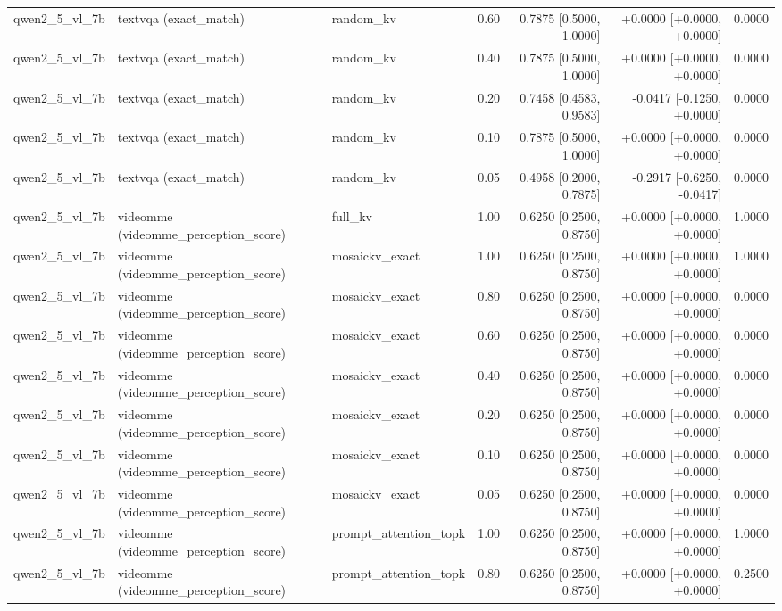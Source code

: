 \begin{longtable}{lllrrrr}
qwen2\_5\_vl\_7b & textvqa (exact\_match) & random\_kv & 0.60 & 0.7875 [0.5000, 1.0000] & +0.0000 [+0.0000, +0.0000] & 0.0000 \\
qwen2\_5\_vl\_7b & textvqa (exact\_match) & random\_kv & 0.40 & 0.7875 [0.5000, 1.0000] & +0.0000 [+0.0000, +0.0000] & 0.0000 \\
qwen2\_5\_vl\_7b & textvqa (exact\_match) & random\_kv & 0.20 & 0.7458 [0.4583, 0.9583] & -0.0417 [-0.1250, +0.0000] & 0.0000 \\
qwen2\_5\_vl\_7b & textvqa (exact\_match) & random\_kv & 0.10 & 0.7875 [0.5000, 1.0000] & +0.0000 [+0.0000, +0.0000] & 0.0000 \\
qwen2\_5\_vl\_7b & textvqa (exact\_match) & random\_kv & 0.05 & 0.4958 [0.2000, 0.7875] & -0.2917 [-0.6250, -0.0417] & 0.0000 \\
qwen2\_5\_vl\_7b & videomme (videomme\_perception\_score) & full\_kv & 1.00 & 0.6250 [0.2500, 0.8750] & +0.0000 [+0.0000, +0.0000] & 1.0000 \\
qwen2\_5\_vl\_7b & videomme (videomme\_perception\_score) & mosaickv\_exact & 1.00 & 0.6250 [0.2500, 0.8750] & +0.0000 [+0.0000, +0.0000] & 1.0000 \\
qwen2\_5\_vl\_7b & videomme (videomme\_perception\_score) & mosaickv\_exact & 0.80 & 0.6250 [0.2500, 0.8750] & +0.0000 [+0.0000, +0.0000] & 0.0000 \\
qwen2\_5\_vl\_7b & videomme (videomme\_perception\_score) & mosaickv\_exact & 0.60 & 0.6250 [0.2500, 0.8750] & +0.0000 [+0.0000, +0.0000] & 0.0000 \\
qwen2\_5\_vl\_7b & videomme (videomme\_perception\_score) & mosaickv\_exact & 0.40 & 0.6250 [0.2500, 0.8750] & +0.0000 [+0.0000, +0.0000] & 0.0000 \\
qwen2\_5\_vl\_7b & videomme (videomme\_perception\_score) & mosaickv\_exact & 0.20 & 0.6250 [0.2500, 0.8750] & +0.0000 [+0.0000, +0.0000] & 0.0000 \\
qwen2\_5\_vl\_7b & videomme (videomme\_perception\_score) & mosaickv\_exact & 0.10 & 0.6250 [0.2500, 0.8750] & +0.0000 [+0.0000, +0.0000] & 0.0000 \\
qwen2\_5\_vl\_7b & videomme (videomme\_perception\_score) & mosaickv\_exact & 0.05 & 0.6250 [0.2500, 0.8750] & +0.0000 [+0.0000, +0.0000] & 0.0000 \\
qwen2\_5\_vl\_7b & videomme (videomme\_perception\_score) & prompt\_attention\_topk & 1.00 & 0.6250 [0.2500, 0.8750] & +0.0000 [+0.0000, +0.0000] & 1.0000 \\
qwen2\_5\_vl\_7b & videomme (videomme\_perception\_score) & prompt\_attention\_topk & 0.80 & 0.6250 [0.2500, 0.8750] & +0.0000 [+0.0000, +0.0000] & 0.2500 \\

\end{longtable}
